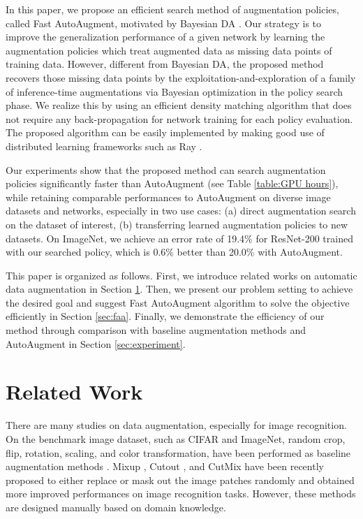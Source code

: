 \documentclass{article}
\newcommand{\cmtt}[1]{{\fontfamily{cmtt}\selectfont #1}}
\begin{document}
In this paper, we propose an efficient search method of augmentation policies, called Fast AutoAugment, motivated by Bayesian DA \cite{tran2017bayesian}. Our strategy is to improve the generalization performance of a given network by learning the augmentation policies which treat augmented data as missing data points of training data. However, different from Bayesian DA, the proposed method recovers those missing data points by the exploitation-and-exploration of a family of inference-time augmentations \cite{simonyan2014very, szegedy2016rethinking} via Bayesian optimization in the policy search phase. We realize this by using an efficient density matching algorithm that does not require any back-propagation for network training for each policy evaluation. The proposed algorithm can be easily implemented by making good use of distributed learning frameworks such as \cmtt{Ray} \cite{ray}.



Our experiments show that the proposed method can search augmentation policies significantly faster than AutoAugment (see Table \ref{table:GPU hours}), while retaining comparable performances to AutoAugment on diverse image datasets and networks, especially in two use cases: (a) direct augmentation search on the dataset of interest, (b) transferring learned augmentation policies to new datasets. On ImageNet, we achieve an error rate of 19.4\% for ResNet-200 trained with our searched policy, which is 0.6\% better than 20.0\% with AutoAugment.

This paper is organized as follows. First, we introduce related works on automatic data augmentation in Section \ref{sec:related-work}. Then, we present our problem setting to achieve the desired goal and suggest Fast AutoAugment algorithm to solve the objective efficiently in Section \ref{sec:faa}. Finally, we demonstrate the efficiency of our method through comparison with baseline augmentation methods and AutoAugment in Section \ref{sec:experiment}. 


\section{Related Work}
\label{sec:related-work}
There are many studies on data augmentation, especially for image
recognition. On the benchmark image dataset, such as CIFAR and ImageNet, random crop, flip, rotation, scaling, and color transformation, have been performed as baseline augmentation methods \cite{krizhevsky2012imagenet,Han_2017_CVPR,sato2015apac}. Mixup \cite{zhang2017mixup}, Cutout \cite{devries2017cutout}, and CutMix \cite{yun2019cutmix} have been recently proposed to either replace or mask out the image patches randomly and obtained more improved performances on image recognition tasks. However, these methods are designed manually based on domain knowledge.
\end{document}
